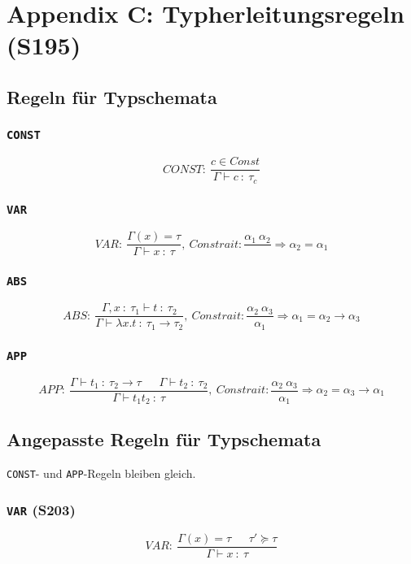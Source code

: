 \section{Appendix C: Typherleitungsregeln (S195)}

\subsection{Regeln für Typschemata}

\subsubsection{\texttt{CONST}}
\[CONST:~\frac{c \in Const}{\Gamma \vdash c~:~\tau_c}\]

\subsubsection{\texttt{VAR}}
\[VAR:~\frac{\Gamma(x)=\tau}{\Gamma \vdash x~:~\tau},~Constrait: \frac{\alpha_1~\alpha_2}{} \Rightarrow \alpha_2 = \alpha_1\]

\subsubsection{\texttt{ABS}}
\[ABS:~\frac{\Gamma,x~:~\tau_1 \vdash t~:~\tau_2}{\Gamma \vdash \lambda x.t~:~\tau_1 \rightarrow \tau_2},~Constrait: \frac{\alpha_2~\alpha_3}{\alpha_1} \Rightarrow \alpha_1 = \alpha_2 \rightarrow \alpha_3\]

\subsubsection{\texttt{APP}}
\[APP:~\frac{\Gamma \vdash t_1~:~\tau_2 \rightarrow \tau~~~~~~~\Gamma\vdash t_2~:~\tau_2}{\Gamma\vdash t_1t_2~:~\tau},~Constrait: \frac{\alpha_2~\alpha_3}{\alpha_1} \Rightarrow \alpha_2 = \alpha_3 \rightarrow \alpha_1\]


\subsection{Angepasste Regeln für Typschemata}
\texttt{CONST}- und \texttt{APP}-Regeln bleiben gleich.

\subsubsection{\texttt{VAR} (S203)}
\[VAR:~\frac{\Gamma(x)=\tau~~~~~~~\tau'\succeq\tau}{\Gamma \vdash x~:~\tau}\]

